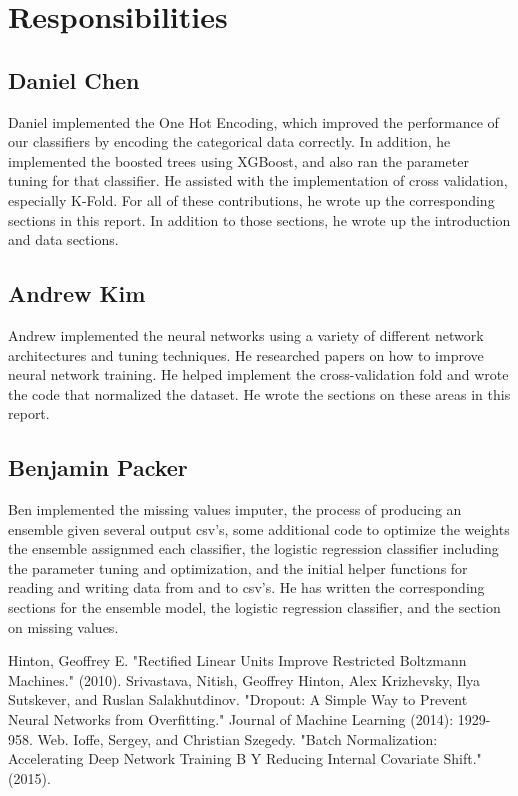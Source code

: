 \documentclass[twoside,11pt]{article}
\theoremstyle{definition}
\begin{document}
\section{Responsibilities}

  \subsection{Daniel Chen}
    Daniel implemented the One Hot Encoding, which improved the performance of our classifiers by encoding the categorical data correctly. In addition, he implemented the boosted trees using XGBoost, and also ran the parameter tuning for that classifier. He assisted with the implementation of cross validation, especially K-Fold. For all of these contributions, he wrote up the corresponding sections in this report. In addition to those sections, he wrote up the introduction and data sections.

  \subsection{Andrew Kim}
    Andrew implemented the neural networks using a variety of different network architectures and tuning techniques. He researched papers on how to improve neural network training. He helped implement the cross-validation fold and wrote the code that normalized the dataset. He wrote the sections on these areas in this report. 

  \subsection{Benjamin Packer}
    Ben implemented the missing values imputer, the process of producing an ensemble given several output csv's, some additional code to optimize the weights the ensemble assignmed each classifier, the logistic regression classifier including the parameter tuning and optimization, and the initial helper functions for reading and writing data from and to csv's. He has written the corresponding sections for the ensemble model, the logistic regression classifier, and the section on missing values.

\begin{thebibliography}{1}
    Hinton, Geoffrey E. "Rectified Linear Units Improve Restricted Boltzmann Machines." (2010). 
    Srivastava, Nitish, Geoffrey Hinton, Alex Krizhevsky, Ilya Sutskever, and Ruslan Salakhutdinov. "Dropout: A Simple Way to Prevent Neural Networks from Overfitting." Journal of Machine Learning (2014): 1929-958. Web. 
    Ioffe, Sergey, and Christian Szegedy. "Batch Normalization: Accelerating Deep Network Training B Y Reducing Internal Covariate Shift." (2015).
\end{thebibliography}
\end{document}
